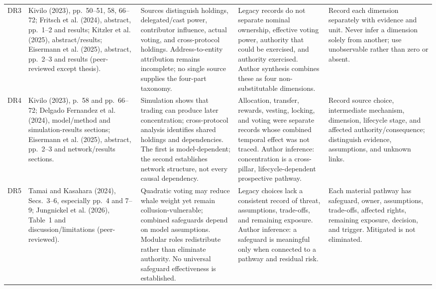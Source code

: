 \documentclass[10pt]{article}
\begin{document}
\begin{landscape}
{\begin{longtable}{@{}p{.035\linewidth}p{.22\linewidth}p{.23\linewidth}p{.22\linewidth}p{.21\linewidth}@{}}
DR3 & Kivilo (2023), pp.~50--51, 58, 66--72; Fritsch et al. (2024), abstract, pp.~1--2 and results; Kitzler et al. (2025), abstract/results; Eisermann et al. (2025), abstract, pp.~2--3 and results (peer-reviewed except thesis). & Sources distinguish holdings, delegated/cast power, contributor influence, actual voting, and cross-protocol holdings. Address-to-entity attribution remains incomplete; no single source supplies the four-part taxonomy. & Legacy records do not separate nominal ownership, effective voting power, authority that could be exercised, and authority exercised. Author synthesis combines these as four non-substitutable dimensions. & Record each dimension separately with evidence and unit. Never infer a dimension solely from another; use unobservable rather than zero or absent. \\
DR4 & Kivilo (2023), p.~58 and pp.~66--72; Delgado Fernandez et al. (2024), model/method and simulation-results sections; Eisermann et al. (2025), abstract, pp.~2--3 and network/results sections. & Simulation shows that trading can produce later concentration; cross-protocol analysis identifies shared holdings and dependencies. The first is model-dependent; the second establishes network structure, not every causal dependency. & Allocation, transfer, rewards, vesting, locking, and voting were separate records whose combined temporal effect was not traced. Author inference: concentration is a cross-pillar, lifecycle-dependent prospective pathway. & Record source choice, intermediate mechanism, dimension, lifecycle stage, and affected authority/consequence; distinguish evidence, assumptions, and unknown links. \\
DR5 & Tamai and Kasahara (2024), Secs.~3--6, especially pp.~4 and 7--9; Jungnickel et al. (2026), Table~1 and discussion/limitations (peer-reviewed). & Quadratic voting may reduce whale weight yet remain collusion-vulnerable; combined safeguards depend on model assumptions. Modular roles redistribute rather than eliminate authority. No universal safeguard effectiveness is established. & Legacy choices lack a consistent record of threat, assumptions, trade-offs, and remaining exposure. Author inference: a safeguard is meaningful only when connected to a pathway and residual risk. & Each material pathway has safeguard, owner, assumptions, trade-offs, affected rights, remaining exposure, decision, and trigger. Mitigated is not eliminated. \\

\end{longtable}}
\end{landscape}
\end{document}
